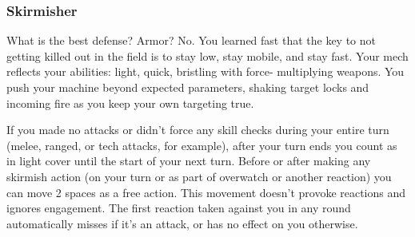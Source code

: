 \subsubsection{Skirmisher}

\begin{talent}
{What is the best defense? Armor? No. You learned fast that the key to not getting killed out in the field is to stay low, stay mobile, and stay fast. Your mech reflects your abilities: light, quick, bristling with force- multiplying weapons. You push your machine beyond expected parameters, shaking target locks and incoming fire as you keep your own targeting true.}

If you made no attacks or didn’t force any skill checks during your entire turn (melee, ranged, or tech attacks, for example), after your turn ends you count as in light cover until the start of your next turn. 
Before or after making any skirmish action (on your turn or as part of overwatch or another reaction) you can move 2 spaces as a free action. This movement doesn’t provoke reactions and ignores engagement. 
The first reaction taken against you in any round automatically misses if it’s an attack, or has no effect on you otherwise.
\end{talent}